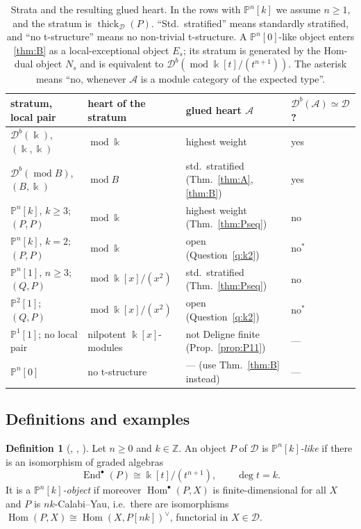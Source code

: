 \documentclass[11pt,reqno]{amsart}
\theoremstyle{plain}
\theoremstyle{definition}
\newtheorem{definition}[theorem]{Definition}
\theoremstyle{remark}
\newcommand{\kk}{\Bbbk}
\DeclareMathOperator{\Hom}{Hom}
\DeclareMathOperator{\End}{End}
\newcommand{\modd}{\operatorname{mod}}
\newcommand{\Db}{\mathcal{D}^b}
\newcommand{\thick}[2][\cD]{\operatorname{thick}_{#1}(#2)}
\newcommand{\Pn}[2]{\mathbb{P}^{#1}[#2]}
\newcommand{\cD}{\mathcal{D}}
\newcommand{\cA}{\mathcal{A}}
\begin{document}
\begin{table}[ht]
\centering
\renewcommand{\arraystretch}{1.25}
\small
\begin{tabular}{@{}llll@{}}
\toprule
stratum, local pair & heart of the stratum & glued heart $\cA$ & $\Db(\cA)\simeq\cD$? \\
\midrule
$\Db(\kk)$, $(\kk,\kk)$ & $\modd\kk$ & highest weight \cite{BB26} & yes \\
$\Db(\modd B)$, $(B,\kk)$ & $\modd B$ & std.\ stratified (Thm.~\ref{thm:A}, \ref{thm:B}) & yes \\
$\Pn nk$, $k\ge 3$; $(P,P)$ & $\modd\kk$ & highest weight (Thm.~\ref{thm:Pseq}) & no \\
$\Pn nk$, $k=2$; $(P,P)$ & $\modd\kk$ & open (Question~\ref{q:k2}) & no$^{\ast}$ \\
$\Pn n1$, $n\ge 3$; $(Q,P)$ & $\modd\kk[x]/(x^2)$ & std.\ stratified (Thm.~\ref{thm:Pseq}) & no \\
$\Pn 21$; $(Q,P)$ & $\modd\kk[x]/(x^2)$ & open (Question~\ref{q:k2}) & no$^{\ast}$ \\
$\Pn 11$; no local pair & nilpotent $\kk[x]$-modules & not Deligne finite (Prop.~\ref{prop:P11}) & --- \\
$\Pn n0$ & no t-structure \cite{Bonf26} & --- (use Thm.~\ref{thm:B} instead) & --- \\
\bottomrule
\end{tabular}
\caption{Strata and the resulting glued heart. In the rows with $\Pn nk$ we assume $n\ge1$, and the stratum is $\thick{P}$. ``Std.\ stratified'' means standardly stratified, and ``no t-structure'' means no non-trivial t-structure. A $\Pn n0$-like object enters \cref{thm:B} as a local-exceptional object $E_s$; its stratum is generated by the Hom-dual object $N_s$ and is equivalent to $\Db(\modd\kk[t]/(t^{n+1}))$. The asterisk means ``no, whenever $\cA$ is a module category of the expected type''.}\label{tab:summary}
\end{table}


\subsection{Definitions and examples}

\begin{definition}[{\cite{Kru18}, \cite[Def.~2.1]{HK19}, \cite[Def.~2.1]{Bonf26}}]\label{def:Pnk}
Let $n\ge0$ and $k\in\mathbb{Z}$. An object $P$ of $\cD$ is \emph{$\Pn nk$-like} if there is an isomorphism of graded algebras
\[\End^\bullet(P)\cong\kk[t]/(t^{n+1}),\qquad\deg t=k.\]
It is a \emph{$\Pn nk$-object} if moreover $\Hom^\bullet(P,X)$ is finite-dimensional for all $X$ and $P$ is $nk$-Calabi--Yau, i.e.\ there are isomorphisms $\Hom(P,X)\cong\Hom(X,P[nk])^\vee$, functorial in $X\in\cD$.
\end{definition}
\end{document}
